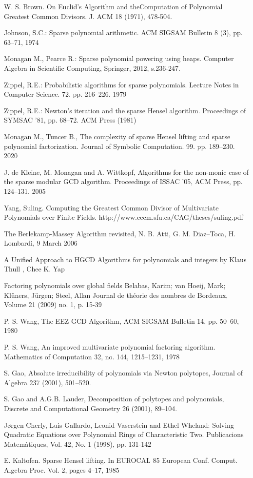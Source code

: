 \documentclass[11pt,reqno]{amsart}
\numberwithin{equation}{section}
\begin{document}
\begin{thebibliography}{99}
 W. S. Brown. On Euclid’s Algorithm and theComputation of
Polynomial Greatest Common Divisors. J. ACM 18 (1971), 478-504.

 Johnson, S.C.: Sparse polynomial arithmetic. ACM SIGSAM
Bulletin 8 (3), pp. 63--71, 1974

 Monagan M., Pearce R.: Sparse polynomial powering using heaps.
Computer Algebra in Scientific Computing, Springer, 2012, s.236-247.

 Zippel, R.E.: Probabilistic algorithms for sparse polynomials.
Lecture Notes in Computer Science. 72. pp. 216--226. 1979

 Zippel, R.E.: Newton’s iteration and the sparse Hensel
algorithm. Proceedings of SYMSAC ’81, pp. 68--72. ACM Press (1981)

 Monagan M., Tuncer B.,
The complexity of sparse Hensel lifting and sparse polynomial factorization.
Journal of Symbolic Computation. 99. pp. 189--230. 2020

  J. de Kleine, M. Monagan and A. Wittkopf, Algorithms for the
non-monic case of the sparse modular GCD algorithm. Proceedings of ISSAC ’05,
ACM Press, pp. 124--131. 2005

 Yang, Suling. Computing the Greatest Common Divisor of
Multivariate Polynomials over Finite Fields.
http://www.cecm.sfu.ca/CAG/theses/suling.pdf

 The Berlekamp-Massey Algorithm revisited, N. B. Atti, G. M.
Diaz–Toca, H. Lombardi, 9 March 2006

 A Unified Approach to HGCD Algorithms for polynomials and
integers by Klaus Thull , Chee K. Yap

  Factoring polynomials over global fields Belabas,
Karim; van Hoeij, Mark; Klüners, Jürgen; Steel, Allan Journal de théorie des
nombres de Bordeaux, Volume 21 (2009) no. 1, p. 15-39

 P. S. Wang, The EEZ-GCD Algorithm, ACM SIGSAM Bulletin 14, pp.
50--60, 1980

 P. S. Wang, An improved multivariate polynomial factoring
algorithm. Mathematics of Computation 32, no. 144, 1215--1231, 1978

 S. Gao, Absolute irreducibility of polynomials via Newton
polytopes, Journal of Algebra
237 (2001), 501--520.

 S. Gao and A.G.B. Lauder, Decomposition of polytopes and
polynomials, Discrete and Computational Geometry 26 (2001), 89--104.

 Jørgen Cherly, Luis Gallardo, Leonid Vaserstein and
Ethel Wheland:  Solving Quadratic Equations over Polynomial Rings of
Characteristic Two. Publicacions Matemàtiques, Vol. 42, No. 1 (1998), pp.
131-142

 E. Kaltofen.  Sparse Hensel lifting.  In EUROCAL 85 European
Conf. Comput. Algebra Proc. Vol. 2, pages 4–17, 1985
\end{thebibliography}
\end{document}
